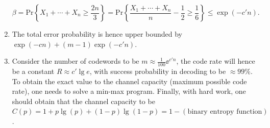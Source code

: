 \begin{enumerate}
    \begin{equation*}
        \beta = \mathrm{Pr}\left\{X_1+\cdots+X_n\ge\frac{2n}{3}\right\} = \mathrm{Pr}\left\{\frac{X_1+\cdots+X_n}{n} - \frac{1}{2}\ge\frac{1}{6}\right\} \le \exp(-c'n).
    \end{equation*}
    \item The total error probability is hence upper bounded by $\exp(-cn) + (m-1)\exp(-c'n)$.
    \item Consider the number of codewords to be $m\approx \frac{1}{100} \ee^{c'n}$, the code rate will hence be a constant $R\approx c'\lg e$, with success probability in decoding to be $\approx 99\%$. To obtain the exact value to the channel capacity (maximum possible code rate), one needs to solve a min-max program. Finally, with hard work, one should obtain that the channel capacity to be $C(p)=1+p\lg(p)+(1-p)\lg(1-p) = 1-(\text{binary entropy function})$.
\end{enumerate}

